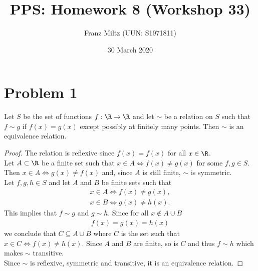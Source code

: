 \documentclass{article}
\title{PPS: Homework 8 (Workshop 33)}
\author{Franz Miltz (UUN: S1971811)}
\date{30 March 2020}
\begin{document}
\maketitle
\section*{Problem 1}
\begin{claim}
	Let $S$ be the set of functions $f:\R\to\R$ and let $\sim$ be a relation on $S$ such that $f\sim g$ if $f(x)=g(x)$ except possibly at finitely many points.
	Then $\sim$ is an equivalence relation.
\end{claim}
\begin{proof}
	The relation is reflexive since $f(x)=f(x)$ for all $x\in\R$.\\
	Let $A\subset \R$ be a finite set such that
	$
		x \in A \Leftrightarrow f(x)\not= g(x)
	$
	for some $f,g\in S$.
	Then
	$
		x\in A \Leftrightarrow g(x)\not=f(x)
	$
	and, since $A$ is still finite, $\sim$ is symmetric.\\
	Let $f,g,h \in S$ and let $A$ and $B$ be finite sets such that
	\begin{align*}
		x\in A \Leftrightarrow f(x)\not= g(x), \\
		x\in B \Leftrightarrow g(x)\not= h(x).
	\end{align*}
	This implies that $f\sim g$ and $g\sim h$. Since for all $x\not\in A\cup B$
	\begin{align*}
		f(x)=g(x)=h(x)
	\end{align*}
	we conclude that $C\subseteq A \cup B$ where $C$ is the set such that $x\in C \Leftrightarrow f(x)\not=h(x)$.
	Since $A$ and $B$ are finite, so is $C$ and thus $f\sim h$ which makes $\sim$ transitive.\\
	Since $\sim$ is reflexive, symmetric and transitive, it is an equivalence relation.
\end{proof}
\end{document}
